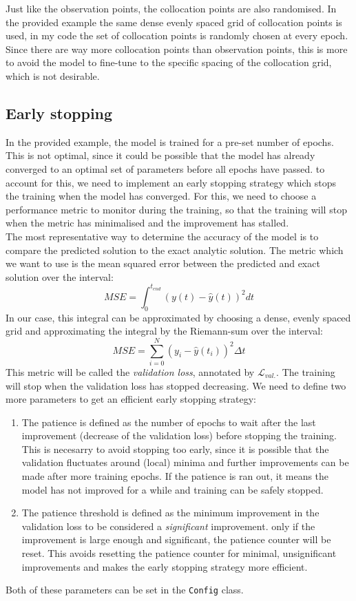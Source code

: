 \documentclass[we,twoside,openright,a4paper,11pt]{uantwerpenbamathesis}
\begin{document}
Just like the observation points, the collocation points are also randomised. In the provided example the same dense evenly spaced grid of collocation points is used, in my code the set of collocation points is randomly chosen at every epoch. Since there are way more collocation points than observation points, this is more to avoid the model to fine-tune to the specific spacing of the collocation grid, which is not desirable.

\subsection{Early stopping}
In the provided example, the model is trained for a pre-set number of epochs. This is not optimal, since it could be possible that the model has already converged to an optimal set of parameters before all epochs have passed. to account for this, we need to implement an early stopping strategy which stops the training when the model has converged. For this, we need to choose a performance metric to monitor during the training, so that the training will stop when the metric has minimalised and the improvement has stalled.\\

The most representative way to determine the accuracy of the model is to compare the predicted solution to the exact analytic solution. The metric which we want to use is the mean squared error between the predicted and exact solution over the interval:
\begin{equation}
    MSE = \int_0^{t_{end}} (y(t)-\hat{y}(t))^2 dt
\end{equation}
In our case, this integral can be approximated by choosing a dense, evenly spaced grid and approximating the integral by the Riemann-sum over the interval:
\begin{equation}
    MSE = \sum_{i=0}^{N} (y_i-\hat{y}(t_i))^2 \Delta t
\end{equation}
This metric will be called the \textit{validation loss}, annotated by $\mathcal{L}_{val.}$. The training will stop when the validation loss has stopped decreasing. We need to define two more parameters to get an efficient early stopping strategy:
\begin{enumerate}
    \item The patience is defined as the number of epochs to wait after the last improvement (decrease of the validation loss) before stopping the training. This is necesarry to avoid stopping too early, since it is possible that the validation fluctuates around (local) minima and further improvements can be made after more training epochs. If the patience is ran out, it means the model has not improved for a while and training can be safely stopped.
    \item The patience threshold is defined as the minimum improvement in the validation loss to be considered a \textit{significant} improvement. only if the improvement is large enough and significant, the patience counter will be reset. This avoids resetting the patience counter for minimal, unsignificant improvements and makes the early stopping strategy more efficient.
\end{enumerate}
Both of these parameters can be set in the \verb|Config| class.
\end{document}
